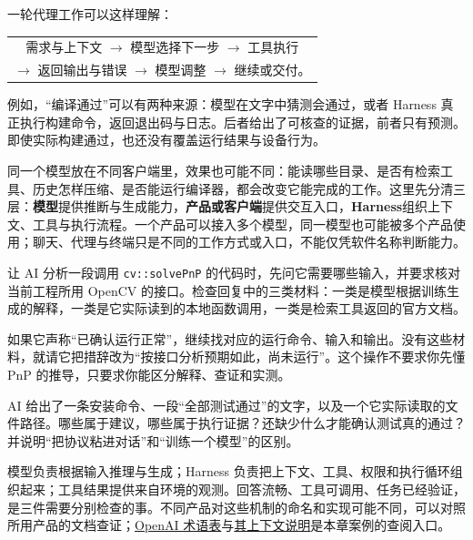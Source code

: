 一轮代理工作可以这样理解：
\begin{center}
\begin{tabular}{c}
需求与上下文 $\longrightarrow$ 模型选择下一步 $\longrightarrow$ 工具执行\\[3pt]
$\longrightarrow$ 返回输出与错误 $\longrightarrow$ 模型调整 $\longrightarrow$ 继续或交付。
\end{tabular}
\end{center}
例如，“编译通过”可以有两种来源：模型在文字中猜测会通过，或者 Harness 真正执行构建命令，返回退出码与日志。后者给出了可核查的证据，前者只有预测。即使实际构建通过，也还没有覆盖运行结果与设备行为。

同一个模型放在不同客户端里，效果也可能不同：能读哪些目录、是否有检索工具、历史怎样压缩、是否能运行编译器，都会改变它能完成的工作。这里先分清三层：\textbf{模型}提供推断与生成能力，\textbf{产品或客户端}提供交互入口，\textbf{Harness}组织上下文、工具与执行流程。一个产品可以接入多个模型，同一模型也可能被多个产品使用；聊天、代理与终端只是不同的工作方式或入口，不能仅凭软件名称判断能力。

\begin{example}
让 AI 分析一段调用 \texttt{cv::solvePnP} 的代码时，先问它需要哪些输入，并要求核对当前工程所用 OpenCV 的接口。检查回复中的三类材料：一类是模型根据训练生成的解释，一类是它实际读到的本地函数调用，一类是检索工具返回的官方文档。

如果它声称“已确认运行正常”，继续找对应的运行命令、输入和输出。没有这些材料，就请它把措辞改为“按接口分析预期如此，尚未运行”。这个操作不要求你先懂 PnP 的推导，只要求你能区分解释、查证和实测。
\end{example}

\begin{exercise}\label{ex:ai-principle-model-agent}
AI 给出了一条安装命令、一段“全部测试通过”的文字，以及一个它实际读取的文件路径。哪些属于建议，哪些属于执行证据？还缺少什么才能确认测试真的通过？并说明“把协议粘进对话”和“训练一个模型”的区别。
\end{exercise}

\begin{conclusion}
模型负责根据输入推理与生成；Harness 负责把上下文、工具、权限和执行循环组织起来；工具结果提供来自环境的观测。回答流畅、工具可调用、任务已经验证，是三件需要分别检查的事。不同产品对这些机制的命名和实现可能不同，可以对照所用产品的文档查证；\href{https://learn.chatgpt.com/docs/glossary}{OpenAI 术语表}与\href{https://developers.openai.com/api/docs/guides/conversation-state#managing-the-context-window}{其上下文说明}是本章案例的查阅入口。
\end{conclusion}

